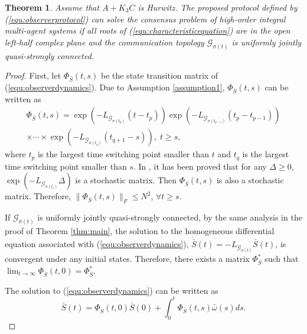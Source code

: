 \documentclass[12pt,draftcls,onecolumn]{IEEEtran}
\newtheorem{thm}{Theorem}
\begin{document}
\begin{thm}\label{thm:main2}
Assume that $A+K_3C$ is \emph{Hurwitz}. The proposed protocol defined by (\ref{equ:observerprotocol}) can solve the consensus problem of high-order integral multi-agent systems if all roots of (\ref{equ:characteristicequation}) are in the open left-half complex plane and the communication topology $\mathcal{G}_{\sigma(t)}$ is uniformly jointly quasi-strongly connected.
\end{thm}
\begin{proof} First, let $\Phi_{\bar{S}}(t,s)$ be the state transition matrix of (\ref{equ:observerdynamics}). Due to Assumption \ref{assumption1}, $\Phi_{\bar{S}}(t,s)$ can be written as
\begin{multline}
\Phi_{\bar{S}}(t,s) = \exp(-L_{\mathcal{G}_{\sigma(t_p)}}(t-t_p))\exp(-L_{\mathcal{G}_{\sigma(t_{p-1})}}(t_p-t_{p-1}))\\\times\cdots\times\exp(-L_{\mathcal{G}_{\sigma(t_{q})}}(t_{q+1}-s)), \; t\geq s,
\end{multline}
where $t_p$ is the largest time switching point smaller than $t$ and $t_q$ is the largest time switching point smaller than $s$. In \cite{Ren04Chapter}, it has been proved that for any $\Delta \geq 0$, $\exp(-L_{\mathcal{G}_{\sigma(t_i)}}\Delta)$ is a stochastic matrix. Then $\Phi_{\bar{S}}(t,s)$ is also a stochastic matrix. Therefore, $\|\Phi_{\bar{S}}(t,s)\|_F\leq N^2$, $\forall t \geq s$.

If $\mathcal{G}_{\sigma(t)}$ is uniformly jointly quasi-strongly connected, by the same analysis in the proof of Theorem \ref{thm:main}, the solution to the homogeneous differential equation associated with (\ref{equ:observerdynamics}), $\dot{\bar{S}}(t) =  -L_{\mathcal{G}_{\sigma(t)}}\bar{S}(t)$, is convergent under any initial states. Therefore, there exists a matrix $\Phi^*_{\bar{S}}$ such that $\lim_{t\to\infty}\Phi_{\bar{S}}(t,0) = \Phi^*_{\bar{S}}$.

The solution to  (\ref{equ:observerdynamics}) can be written as
\begin{equation}\label{equ:observersolution}
\bar{S}(t) = \Phi_{\bar{S}}(t,0)\bar{S}(0) + \int^t_0\Phi_{\bar{S}}(t,s)\bar{\omega}(s)ds.
\end{equation}


\end{proof}
\end{document}
